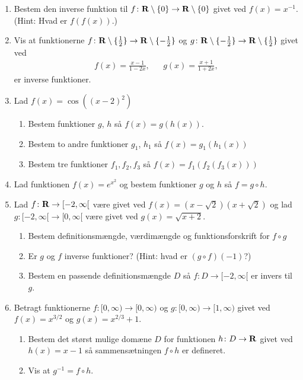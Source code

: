 \begin{enumerate}
	
	\item Bestem den inverse funktion til $f\colon \mathbf{R}\setminus \{0\}\to \mathbf{R}\setminus\{0\}$ givet ved $f(x)=x^{-1}$. (Hint: Hvad er $f(f(x))$.)
	
	\item Vis at funktionerne $f\colon \mathbf{R}\setminus \{ \frac{1}{2}\}\to \mathbf{R}\setminus \{-\frac{1}{2} \}$ og $g\colon \mathbf{R}\setminus \{- \frac{1}{2}\} \to \mathbf{R}\setminus \{\frac{1}{2}\}$ givet ved
	\begin{align*}
	f(x)=\frac{x-1}{1-2x},&&g(x)=\frac{x+1}{1+2x},
	\end{align*}
	er inverse funktioner.
	
	\item Lad $f(x)=\cos((x-2)^2)$
	\begin{enumerate}
		\item Bestem funktioner $g$, $h$ så $f(x)=g(h(x))$.
		\item Bestem to andre funktioner $g_1$, $h_1$ så $f(x)=g_1(h_1(x))$
		\item Bestem tre funktioner $f_1,f_2,f_3$ så $f(x)=f_1(f_2(f_3(x)))$
	\end{enumerate}
	
	
	\item Lad funktionen $f(x)=e^{x^2}$ og bestem funktioner $g$ og $h$ så $f=g\circ h$.
	
	\item Lad $f\colon \mathbf{R}\to [-2,\infty[$ være givet ved $f(x)=(x-\sqrt{2})(x+\sqrt{2})$ og lad $g\colon [-2,\infty[\to [0,\infty[$ være givet ved $g(x)=\sqrt{x+2}$.
	\begin{enumerate}
		\item Bestem definitionsmængde, værdimængde og funktionsforskrift for $f\circ g$
		\item Er $g$ og $f$ inverse funktioner? (Hint: hvad er $(g\circ f)(-1)$?)
		\item Bestem en passende definitionsmængde $D$ så $f\colon D\to [-2,\infty[$ er invers til $g$.
	\end{enumerate}
	
		
	
	\item Betragt funktionerne $f\colon [0,\infty)\to [0,\infty)$ og $g\colon [0,\infty)\to[1,\infty)$ givet ved $f(x)=x^{3/2}$ og $g(x)=x^{2/3}+1$. 
	\begin{enumerate}
		\item Bestem det størst mulige domæne $D$ for funktionen $h\colon D\to \mathbf{R}$ givet ved $h(x)=x-1$ så sammensætningen $f \circ h$ er defineret.
		\item Vis at $g^{-1}=f\circ h$.
		\end{enumerate}
	
	
	
	
\end{enumerate}